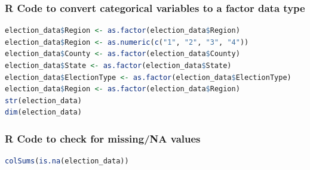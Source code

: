 \documentclass[11pt]{article}
\begin{document}
\subsubsection{R Code to convert categorical variables to a factor data type}
\begin{lstlisting}[language=R]
election_data$Region <- as.factor(election_data$Region)
election_data$Region <- as.numeric(c("1", "2", "3", "4"))
election_data$County <- as.factor(election_data$County)
election_data$State <- as.factor(election_data$State)
election_data$ElectionType <- as.factor(election_data$ElectionType)
election_data$Region <- as.factor(election_data$Region)
str(election_data)
dim(election_data)
\end{lstlisting}

\subsubsection{R Code to check for missing/NA values}
\begin{lstlisting}[language=R]
colSums(is.na(election_data))
\end{lstlisting}
\end{document}
